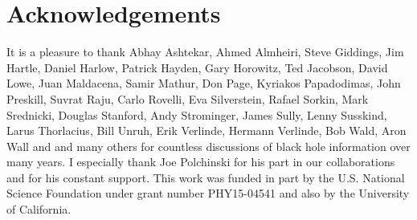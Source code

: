 \documentclass[10pt]{article}
\begin{document}
\section*{Acknowledgements}
It is a pleasure to thank Abhay Ashtekar, Ahmed Almheiri, Steve Giddings, Jim Hartle, Daniel Harlow, Patrick Hayden, Gary Horowitz, Ted Jacobson, David Lowe, Juan Maldacena, Samir Mathur, Don Page,  Kyriakos Papadodimas, John Preskill,  Suvrat Raju, Carlo Rovelli, Eva Silverstein, Rafael Sorkin, Mark Srednicki, Douglas Stanford, Andy Strominger, James Sully, Lenny Susskind, Larus Thorlacius, Bill Unruh, Erik Verlinde, Hermann Verlinde, Bob Wald, Aron Wall and and many others for countless discussions of black hole information over many years. I especially thank Joe Polchinski for his part in our collaborations and for his constant support.  This work was funded in part by the U.S. National Science Foundation under grant number PHY15-04541 and also by the University of California.
\end{document}
